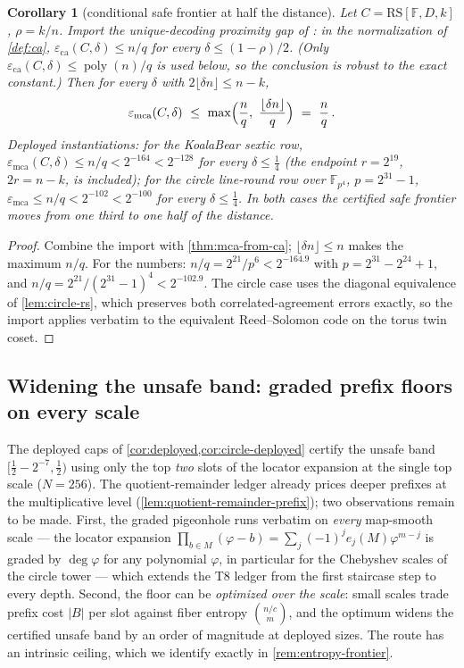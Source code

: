 \documentclass[11pt]{article}
\newtheorem{corollary}[theorem]{Corollary}
\theoremstyle{definition}
\theoremstyle{remark}
\newcommand{\F}{\mathbb{F}}
\newcommand{\B}{B}
\newcommand{\RS}{\mathrm{RS}}
\newcommand{\eca}{\varepsilon_{\mathrm{ca}}}
\newcommand{\emca}{\varepsilon_{\mathrm{mca}}}
\begin{document}
\begin{corollary}[conditional safe frontier at half the distance]\label{cor:conditional-half}
Let $C=\RS[\F,D,k]$, $\rho=k/n$. Import the unique-decoding proximity gap of \cite[Thm.~4.1]{BCIKS20}: in the normalization of \cref{def:ca}, $\eca(C,\delta)\le n/q$ for every $\delta\le(1-\rho)/2$. (Only $\eca(C,\delta)\le\operatorname{poly}(n)/q$ is used below, so the conclusion is robust to the exact constant.) Then for every $\delta$ with $2\lfloor\delta n\rfloor\le n-k$,
\[
\emca(C,\delta)\ \le\ \max\Bigl(\frac nq,\ \frac{\lfloor\delta n\rfloor}q\Bigr)\ =\ \frac nq\,.
\]
Deployed instantiations: for the KoalaBear sextic row, $\emca(C,\delta)\le n/q<2^{-164}<2^{-128}$ for every $\delta\le\tfrac14$ (the endpoint $r=2^{19}$, $2r=n-k$, is included); for the circle line-round row over $\F_{p^4}$, $p=2^{31}-1$, $\emca\le n/q<2^{-102}<2^{-100}$ for every $\delta\le\tfrac14$. In both cases the certified safe frontier moves from one third to one half of the distance.
\end{corollary}

\begin{proof}
Combine the import with \cref{thm:mca-from-ca}; $\lfloor\delta n\rfloor\le n$ makes the maximum $n/q$. For the numbers: $n/q=2^{21}/p^6<2^{-164.9}$ with $p=2^{31}-2^{24}+1$, and $n/q=2^{21}/(2^{31}-1)^4<2^{-102.9}$. The circle case uses the diagonal equivalence of \cref{lem:circle-rs}, which preserves both correlated-agreement errors exactly, so the import applies verbatim to the equivalent Reed--Solomon code on the torus twin coset.
\end{proof}

\subsection{Widening the unsafe band: graded prefix floors on every scale}\label{sec:pincer-floors}

The deployed caps of \cref{cor:deployed,cor:circle-deployed} certify the unsafe band $[\tfrac12-2^{-7},\tfrac12)$ using only the top \emph{two} slots of the locator expansion at the single top scale ($N=256$). The quotient-remainder ledger already prices deeper prefixes at the multiplicative level (\cref{lem:quotient-remainder-prefix}); two observations remain to be made. First, the graded pigeonhole runs verbatim on \emph{every} map-smooth scale --- the locator expansion $\prod_{b\in M}(\varphi-b)=\sum_j(-1)^je_j(M)\varphi^{m-j}$ is graded by $\deg\varphi$ for any polynomial $\varphi$, in particular for the Chebyshev scales of the circle tower --- which extends the T8 ledger from the first staircase step to every depth. Second, the floor can be \emph{optimized over the scale}: small scales trade prefix cost $|\B|$ per slot against fiber entropy $\binom{n/c}{m}$, and the optimum widens the certified unsafe band by an order of magnitude at deployed sizes. The route has an intrinsic ceiling, which we identify exactly in \cref{rem:entropy-frontier}.
\end{document}
